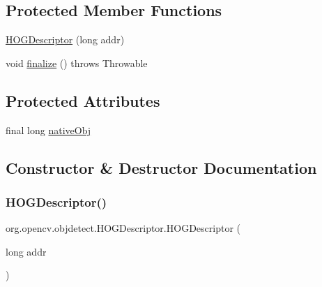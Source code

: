 \subsection*{Protected Member Functions}
\begin{DoxyCompactItemize}
\item 
\mbox{\hyperlink{classorg_1_1opencv_1_1objdetect_1_1_h_o_g_descriptor_a7c10bffe02b9b29ede8dca4c9c9da740}{H\+O\+G\+Descriptor}} (long addr)
\item 
void \mbox{\hyperlink{classorg_1_1opencv_1_1objdetect_1_1_h_o_g_descriptor_a86a8daa844f72e4c2fb8dc133bf0acf0}{finalize}} ()  throws Throwable 
\end{DoxyCompactItemize}
\subsection*{Protected Attributes}
\begin{DoxyCompactItemize}
\item 
final long \mbox{\hyperlink{classorg_1_1opencv_1_1objdetect_1_1_h_o_g_descriptor_a97c4daabbef26778df6a2fb4d6863e9d}{native\+Obj}}
\end{DoxyCompactItemize}


\subsection{Constructor \& Destructor Documentation}
\mbox{\label{classorg_1_1opencv_1_1objdetect_1_1_h_o_g_descriptor_a7c10bffe02b9b29ede8dca4c9c9da740}} 
\subsubsection{\texorpdfstring{H\+O\+G\+Descriptor()}{HOGDescriptor()}\hspace{0.1cm}{\footnotesize\ttfamily [1/5]}}
{\footnotesize\ttfamily org.\+opencv.\+objdetect.\+H\+O\+G\+Descriptor.\+H\+O\+G\+Descriptor (\begin{DoxyParamCaption}\item[{long}]{addr }\end{DoxyParamCaption})\hspace{0.3cm}{\ttfamily [protected]}}

